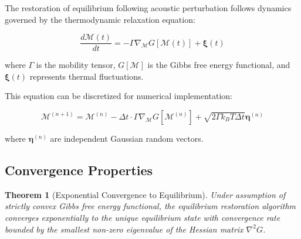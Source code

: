 \documentclass[12pt,a4paper]{article}
\newtheorem{theorem}{Theorem}[section]
\begin{document}
The restoration of equilibrium following acoustic perturbation follows dynamics governed by the thermodynamic relaxation equation:

\begin{equation}
\frac{d\mathcal{M}(t)}{dt} = -\Gamma \nabla_{\mathcal{M}} G[\mathcal{M}(t)] + \boldsymbol{\xi}(t)
\end{equation}

where $\Gamma$ is the mobility tensor, $G[\mathcal{M}]$ is the Gibbs free energy functional, and $\boldsymbol{\xi}(t)$ represents thermal fluctuations.

This equation can be discretized for numerical implementation:

\begin{equation}
\mathcal{M}^{(n+1)} = \mathcal{M}^{(n)} - \Delta t \cdot \Gamma \nabla_{\mathcal{M}} G[\mathcal{M}^{(n)}] + \sqrt{2\Gamma k_B T \Delta t} \boldsymbol{\eta}^{(n)}
\end{equation}

where $\boldsymbol{\eta}^{(n)}$ are independent Gaussian random vectors.

\subsection{Convergence Properties}

\begin{theorem}[Exponential Convergence to Equilibrium]
Under assumption of strictly convex Gibbs free energy functional, the equilibrium restoration algorithm converges exponentially to the unique equilibrium state with convergence rate bounded by the smallest non-zero eigenvalue of the Hessian matrix $\nabla^2 G$.
\end{theorem}
\end{document}
